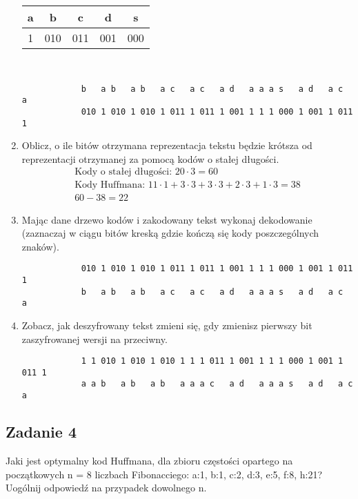 \documentclass{article}
\begin{document}
\begin{enumerate}[label=(\alph*)]
          \begin{center}
              \begin{tabular}{|c|c|c|c|c|}
                  \hline
                  a & b   & c   & d   & s   \\
                  \hline
                  1 & 010 & 011 & 001 & 000 \\
                  \hline
              \end{tabular} \\[1em]
              \begin{lstlisting}
            b   a b   a b   a c   a c   a d   a a a s   a d   a c   a
            010 1 010 1 010 1 011 1 011 1 001 1 1 1 000 1 001 1 011 1
              \end{lstlisting}
          \end{center}
    \item Oblicz, o ile bitów otrzymana reprezentacja tekstu będzie krótsza od reprezentacji
          otrzymanej za pomocą kodów o stałej długości.
          \begin{gather*}
              \text{Kody o stałej długości: } 20 \cdot 3 = 60 \\
              \text{Kody Huffmana: } 11 \cdot 1 + 3 \cdot 3 + 3 \cdot 3 + 2 \cdot 3 + 1 \cdot 3 = 38 \\
              60 - 38 = 22
          \end{gather*}
    \item Mając dane drzewo kodów i zakodowany tekst wykonaj dekodowanie (zaznaczaj w
          ciągu bitów kreską gdzie kończą się kody poszczególnych znaków).
          \begin{lstlisting}
            010 1 010 1 010 1 011 1 011 1 001 1 1 1 000 1 001 1 011 1
            b   a b   a b   a c   a c   a d   a a a s   a d   a c   a
          \end{lstlisting}
    \item Zobacz, jak deszyfrowany tekst zmieni się, gdy zmienisz pierwszy bit zaszyfrowanej
          wersji na przeciwny.
          \begin{lstlisting}
            1 1 010 1 010 1 010 1 1 1 011 1 001 1 1 1 000 1 001 1 011 1
            a a b   a b   a b   a a a c   a d   a a a s   a d   a c   a
          \end{lstlisting}
\end{enumerate}

\subsection*{Zadanie 4}
Jaki jest optymalny kod Huffmana, dla zbioru częstości opartego na początkowych n = 8
liczbach Fibonacciego: a:1, b:1, c:2, d:3, e:5, f:8, h:21?
Uogólnij odpowiedź na przypadek dowolnego n.
\end{document}
